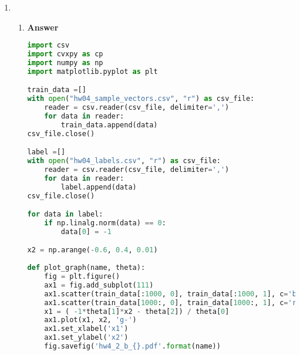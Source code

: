 \documentclass[11pt]{article}
\begin{document}
\begin{enumerate}[label=(\alph*)]
\begin{figure}[H]
\begin{subfigure}{.5\textwidth}
  \centering
  \texttt{[image: hw4\_2\_a\_1]}
  \caption{}
  \label{fig:hw4_2_a_1}
\end{subfigure}
\begin{subfigure}{.5\textwidth}
  \centering
  \texttt{[image: hw4\_2\_a\_2]}
  \caption{}
  \label{fig:hw4_2_a_2}
\end{subfigure}

\caption{$||\theta||_2$ vs iteration}
\label{fig:hw4_2_a_2}
\end{figure}

The figure \ref{fig:hw4_2_a_1} shows the $||\theta||_2$ vs iteration for entire iteration. The $||\theta||_2$ increases at the starting of iteration but seems to be constant after certain iteration. However, figure \ref{fig:hw4_2_a_2} shows the $||\theta||_2$ vs iteration for last 20 iteration shows that the $||\theta||_2$ keeps increasing.


\item

\begin{enumerate}[label=(\roman*)]

\item  \textbf{Answer}

\begin{lstlisting}[language=Python, showstringspaces=false]
import csv
import cvxpy as cp
import numpy as np
import matplotlib.pyplot as plt

train_data =[]
with open("hw04_sample_vectors.csv", "r") as csv_file:
    reader = csv.reader(csv_file, delimiter=',')    
    for data in reader:
        train_data.append(data)        
csv_file.close()

label =[]
with open("hw04_labels.csv", "r") as csv_file:    
    reader = csv.reader(csv_file, delimiter=',')    
    for data in reader:
        label.append(data)        
csv_file.close()

for data in label:
    if np.linalg.norm(data) == 0:
        data[0] = -1

x2 = np.arange(-0.6, 0.4, 0.01)
        
def plot_graph(name, theta):
    fig = plt.figure()
    ax1 = fig.add_subplot(111)
    ax1.scatter(train_data[:1000, 0], train_data[:1000, 1], c='b', s=3)
    ax1.scatter(train_data[1000:, 0], train_data[1000:, 1], c='r', s=3)
    x1 = ( -1*theta[1]*x2 - theta[2]) / theta[0]
    ax1.plot(x1, x2, 'g-')
    ax1.set_xlabel('x1')
    ax1.set_ylabel('x2')
    fig.savefig('hw4_2_b_{}.pdf'.format(name))
        

\end{lstlisting}
\end{enumerate}
\end{enumerate}
\end{document}
